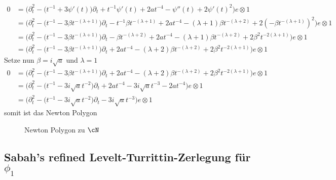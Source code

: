 \begin{try}
\begin{try}
\begin{align*}
0 &= \Big(\partial_t^2 - \big(t^{-1} + 3\psi'(t)\big)\partial_t
   + t^{-1} \psi'(t) + 2at^{-4} -\psi''(t)
   + 2 \psi'(t)^2\Big) e\otimes 1
\\&= \Big(\partial_t^2 - \big(t^{-1} - 3\beta t^{-(\lambda+1)}\big)\partial_t
   - t^{-1} \beta t^{-(\lambda+1)} + 2at^{-4} - (\lambda+1)\beta
   t^{-(\lambda+2)}
   + 2 (-\beta t^{-(\lambda+1)})^2\Big) e\otimes 1
\\&= \Big(\partial_t^2 - \big(t^{-1} - 3\beta t^{-(\lambda+1)}\big)\partial_t
   - \beta t^{-(\lambda+2)} + 2at^{-4} - (\lambda+1)\beta t^{-(\lambda+2)}
   + 2 \beta^2 t^{-2(\lambda+1)}\Big) e\otimes 1
\\&= \Big(\partial_t^2 - \big(t^{-1} - 3\beta t^{-(\lambda+1)}\big)\partial_t
   + 2at^{-4} - (\lambda+2)\beta t^{-(\lambda+2)}
   + 2 \beta^2 t^{-2(\lambda+1)}\Big) e\otimes 1
\end{align*}
Setze nun $\beta=i\sqrt{a}$ und $\lambda=1$
\begin{align*}
0 &= \Big(\partial_t^2 - \big(t^{-1} - 3\beta t^{-(\lambda+1)}\big)\partial_t
   + 2at^{-4} - (\lambda+2)\beta t^{-(\lambda+2)}
   + 2 \beta^2 t^{-2(\lambda+1)}\Big) e\otimes 1
\\&= \Big(\partial_t^2 - \big(t^{-1} - 3i\sqrt{a}
    t^{-2}\big)\partial_t
   + 2at^{-4} - 3i\sqrt{a} t^{-3}
   - 2a t^{-4}\Big) e\otimes 1
\\&= \Big(\partial_t^2 - \big(t^{-1} - 3i\sqrt{a} t^{-2}\big)\partial_t
   - 3i\sqrt{a} t^{-3} \Big) e\otimes 1
\end{align*}
somit ist das Newton Polygon
\begin{figure}[H]
\caption{Newton Polygon zu $\cN$}
\begin{center}
\end{center}
\end{figure}
\end{try}
\end{try}


\subsection{Sabah's refined Levelt-Turrittin-Zerlegung für $\phi_1$}

\iffalse

